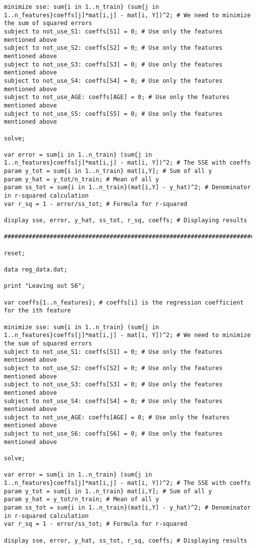 \documentclass[15pt,a4paper,openright]{article}
\begin{document}
\begin{lstlisting}[language=AMPL, caption=1b Code]
minimize sse: sum{i in 1..n_train} (sum{j in 1..n_features}coeffs[j]*mat[i,j] - mat[i, Y])^2; # We need to minimize the sum of squared errors
subject to not_use_S1: coeffs[S1] = 0; # Use only the features mentioned above
subject to not_use_S2: coeffs[S2] = 0; # Use only the features mentioned above
subject to not_use_S3: coeffs[S3] = 0; # Use only the features mentioned above
subject to not_use_S4: coeffs[S4] = 0; # Use only the features mentioned above
subject to not_use_AGE: coeffs[AGE] = 0; # Use only the features mentioned above
subject to not_use_S5: coeffs[S5] = 0; # Use only the features mentioned above

solve;

var error = sum{i in 1..n_train} (sum{j in 1..n_features}coeffs[j]*mat[i,j] - mat[i, Y])^2; # The SSE with coeffs
param y_tot = sum{i in 1..n_train} mat[i,Y]; # Sum of all y
param y_hat = y_tot/n_train; # Mean of all y
param ss_tot = sum{i in 1..n_train}(mat[i,Y] - y_hat)^2; # Denominator in r-squared calculation
var r_sq = 1 - error/ss_tot; # Formula for r-squared

display sse, error, y_hat, ss_tot, r_sq, coeffs; # Displaying results

#########################################################################

reset;

data reg_data.dat;

print "Leaving out S6";

var coeffs{1..n_features}; # coeffs[i] is the regression coefficient for the ith feature

minimize sse: sum{i in 1..n_train} (sum{j in 1..n_features}coeffs[j]*mat[i,j] - mat[i, Y])^2; # We need to minimize the sum of squared errors
subject to not_use_S1: coeffs[S1] = 0; # Use only the features mentioned above
subject to not_use_S2: coeffs[S2] = 0; # Use only the features mentioned above
subject to not_use_S3: coeffs[S3] = 0; # Use only the features mentioned above
subject to not_use_S4: coeffs[S4] = 0; # Use only the features mentioned above
subject to not_use_AGE: coeffs[AGE] = 0; # Use only the features mentioned above
subject to not_use_S6: coeffs[S6] = 0; # Use only the features mentioned above

solve;

var error = sum{i in 1..n_train} (sum{j in 1..n_features}coeffs[j]*mat[i,j] - mat[i, Y])^2; # The SSE with coeffs
param y_tot = sum{i in 1..n_train} mat[i,Y]; # Sum of all y
param y_hat = y_tot/n_train; # Mean of all y
param ss_tot = sum{i in 1..n_train}(mat[i,Y] - y_hat)^2; # Denominator in r-squared calculation
var r_sq = 1 - error/ss_tot; # Formula for r-squared

display sse, error, y_hat, ss_tot, r_sq, coeffs; # Displaying results

\end{lstlisting}
\end{document}
